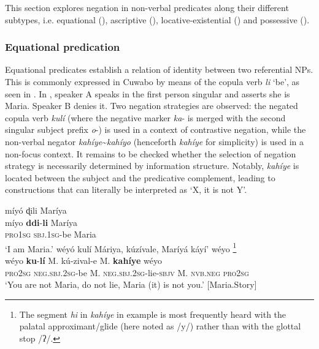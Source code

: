 \documentclass[output=paper,colorlinks=true, citecolor=brown,draftmode]{langscibook}
\begin{document}
This section explores negation in non-verbal predicates along their different subtypes, i.e. equational (), ascriptive (), locative-existen\-tial () and possessive ().

\subsubsection{Equational predication}\label{sec:cuw:2.3.1}
Equational predicates establish a relation of identity between two referential NPs. This is commonly expressed in Cuwabo by means of the copula verb \textit{li} ‘be’, as seen in . In , speaker A speaks in the first person singular and asserts she is Maria. Speaker B denies it.
Two negation strategies are observed: the negated copula verb \textit{kulí} (where the negative marker \textit{ka}{}- is merged with the second singular subject prefix \textit{o}{}-) is used in a context of contrastive negation, while the non-verbal negator \textit{kahíye}{\textasciitilde}\textit{kahíyo} (henceforth \textit{kahíye} for simplicity) is used in a non-focus context. It remains to be checked whether the selection of negation strategy is necessarily determined by information structure. Notably, \textit{kahíye} is located between the subject and the predicative complement, leading to constructions that can literally be interpreted as ‘X, it is not Y’.

\ea\label{ex:cuw:14}
     \begin{xlist}[A: ]
    \label{ex:cuw:14A} míyó ɖili Maríya \\
         \gll  míyo \textbf{ddi}{}-\textbf{li} Maríya \\ 
                \textsc{pro1sg} \textsc{sbj.1sg-}be Maria \\ 
         \glt  ‘I am Maria.’
    \label{ex:cuw:14B} wéyó kulí Máriya, kúzívale, Maríyá káyí’ wéyo \footnote{The segment \textit{hi} in \textit{kahíye} in example  is most frequently heard with the palatal approximant/glide (here noted as /y/) rather than with the glottal stop /ʔ/.} \\ 
        \gll  wéyo \textbf{ku}{}-\textbf{lí} M. kú-zival-e M. \textbf{kahíye} wéyo \\
             \textsc{pro2sg} \textsc{neg}.\textsc{sbj.2sg}{}-be M. \textsc{neg}.\textsc{sbj.2sg}{}-lie-\textsc{sbjv} M. \textsc{nvb.neg} \textsc{pro2sg} \\
        \glt  ‘You are not Maria, do not lie, Maria (it) is not you.’ [Maria.Story]
     \end{xlist}
 \z 
\end{document}
